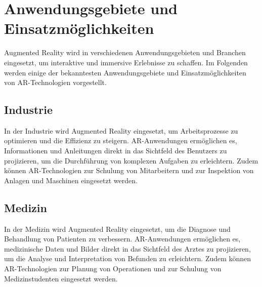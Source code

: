\section{Anwendungsgebiete und Einsatzmöglichkeiten}

Augmented Reality wird in verschiedenen Anwendungsgebieten und Branchen eingesetzt, um interaktive und immersive Erlebnisse zu schaffen. Im Folgenden werden einige der bekanntesten Anwendungsgebiete und Einsatzmöglichkeiten von AR-Technologien vorgestellt.

\subsection{Industrie}

In der Industrie wird Augmented Reality eingesetzt, um Arbeitsprozesse zu optimieren und die Effizienz zu steigern. AR-Anwendungen ermöglichen es, Informationen und Anleitungen direkt in das Sichtfeld des Benutzers zu projizieren, um die Durchführung von komplexen Aufgaben zu erleichtern. Zudem können AR-Technologien zur Schulung von Mitarbeitern und zur Inspektion von Anlagen und Maschinen eingesetzt werden. \cite{industrie}

\subsection{Medizin}

In der Medizin wird Augmented Reality eingesetzt, um die Diagnose und Behandlung von Patienten zu verbessern. AR-Anwendungen ermöglichen es, medizinische Daten und Bilder direkt in das Sichtfeld des Arztes zu projizieren, um die Analyse und Interpretation von Befunden zu erleichtern. Zudem können AR-Technologien zur Planung von Operationen und zur Schulung von Medizinstudenten eingesetzt werden. \cite{medizin}

